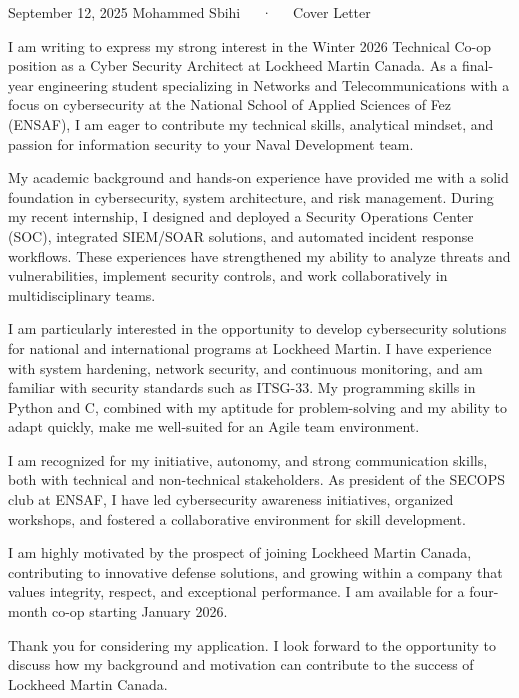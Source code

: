 \documentclass[11pt, a4paper]{awesome-cv}
\begin{document}
\makecvheader[R]

\makecvfooter
{September 12, 2025}
{Mohammed Sbihi~~~·~~~Cover Letter}
{}

\makelettertitle

\begin{cvletter}

    I am writing to express my strong interest in the Winter 2026 Technical Co-op position as a Cyber Security Architect at Lockheed Martin Canada. As a final-year engineering student specializing in Networks and Telecommunications with a focus on cybersecurity at the National School of Applied Sciences of Fez (ENSAF), I am eager to contribute my technical skills, analytical mindset, and passion for information security to your Naval Development team.

    My academic background and hands-on experience have provided me with a solid foundation in cybersecurity, system architecture, and risk management. During my recent internship, I designed and deployed a Security Operations Center (SOC), integrated SIEM/SOAR solutions, and automated incident response workflows. These experiences have strengthened my ability to analyze threats and vulnerabilities, implement security controls, and work collaboratively in multidisciplinary teams.

    I am particularly interested in the opportunity to develop cybersecurity solutions for national and international programs at Lockheed Martin. I have experience with system hardening, network security, and continuous monitoring, and am familiar with security standards such as ITSG-33. My programming skills in Python and C, combined with my aptitude for problem-solving and my ability to adapt quickly, make me well-suited for an Agile team environment.

    I am recognized for my initiative, autonomy, and strong communication skills, both with technical and non-technical stakeholders. As president of the SECOPS club at ENSAF, I have led cybersecurity awareness initiatives, organized workshops, and fostered a collaborative environment for skill development.

    I am highly motivated by the prospect of joining Lockheed Martin Canada, contributing to innovative defense solutions, and growing within a company that values integrity, respect, and exceptional performance. I am available for a four-month co-op starting January 2026.

    Thank you for considering my application. I look forward to the opportunity to discuss how my background and motivation can contribute to the success of Lockheed Martin Canada.

\end{cvletter}

\makeletterclosing
\end{document}
